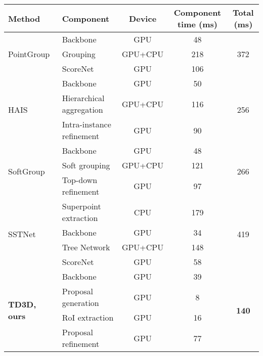 \documentclass[10pt,twocolumn,letterpaper]{article}
\begin{document}
\begin{table*}[h!]
\centering
\begin{tabular}{llccc}
\toprule
Method                      & Component             & Device  & Component time (ms) & Total (ms)           \\
\midrule
\multirow{3}{*}{PointGroup~\cite{jiang2020pointgroup}} & Backbone              & GPU     & 48                  & \multirow{3}{*}{372} \\
                            & Grouping              & GPU+CPU & 218                 &                      \\
                            & ScoreNet              & GPU     & 106                 &                      \\
\midrule
\multirow{3}{*}{HAIS~\cite{chen2021hierarchical}}       & Backbone              & GPU     & 50                  & \multirow{3}{*}{256} \\
                            & Hierarchical aggregation           & GPU+CPU & 116                 &                      \\
                            & Intra-instance refinement & GPU     & 90                  &                      \\
\midrule
\multirow{3}{*}{SoftGroup~\cite{vu2022softgroup}}  & Backbone              & GPU     & 48                  & \multirow{3}{*}{266} \\
                            & Soft grouping         & GPU+CPU & 121                 &                      \\
                            & Top-down refinement   & GPU     & 97                  &                      \\
\midrule
\multirow{4}{*}{SSTNet~\cite{liang2021instance}}     & Superpoint extraction & CPU     & 179                 & \multirow{4}{*}{419} \\
                            & Backbone              & GPU     & 34                  &                      \\
                            & Tree Network          & GPU+CPU & 148                 &                      \\
                            & ScoreNet              & GPU     & 58                  &                      \\
\midrule
\multirow{4}{*}{\textbf{TD3D, ours}} &  Backbone    & GPU     & 39                  & \multirow{4}{*}{\textbf{140}}    \\
                            & Proposal generation   & GPU     & 8                   &                      \\
                            & RoI extraction        & GPU     & 16                  &                      \\
                            & Proposal refinement   & GPU     & 77                  &         \\  
\bottomrule
\end{tabular} 


\end{table*}
\end{document}
